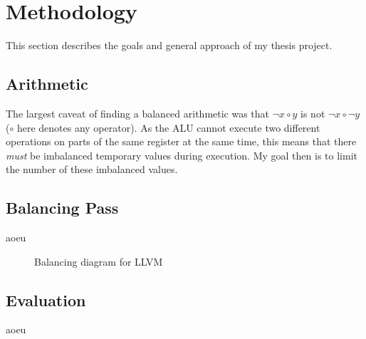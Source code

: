 \section{Methodology}
\label{methodology}
This section describes the goals and general approach of my thesis project.

\subsection{Arithmetic}
The largest caveat of finding a balanced arithmetic was that $\neg{x \circ y}$ is not $\neg{x} \circ \neg{y}$ ($\circ$ here denotes any operator).
As the ALU cannot execute two different operations on parts of the same register at the same time, this means that there \emph{must} be imbalanced temporary values during execution.
My goal then is to limit the number of these imbalanced values.

\subsection{Balancing Pass}
aoeu
\begin{figure}[h]
  \caption{Balancing diagram for LLVM}
  \label{fig:balancing}
\end{figure}

\subsection{Evaluation}
aoeu
